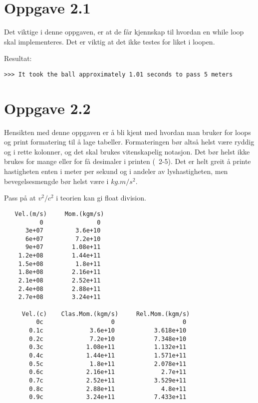 \documentclass[10pt,a4paper]{article}
\begin{document}
\section*{Oppgave 2.1}
Det viktige i denne oppgaven, er at de får kjennskap til hvordan en while loop skal implementeres. Det er viktig at det ikke testes for liket i loopen. 

Resultat:
\begin{verbatim}
>>> It took the ball approximately 1.01 seconds to pass 5 meters
\end{verbatim}

\section*{Oppgave 2.2}
Hensikten med denne oppgaven er å bli kjent med hvordan man bruker for loops og print formatering til å lage tabeller. Formateringen bør altså helst være ryddig og i rette kolonner, og det skal brukes vitenskapelig notasjon. Det bør helst ikke brukes for mange eller for få desimaler i printen (~2-5). Det er helt greit å printe hastigheten enten i meter per sekund og i andeler av lyshastigheten, men bevegelsesmengde bør helst være i $\si{kg.m/s^2}$.

Pass på at $v^2/c^2$ i teorien kan gi float division.





\newpage
\begin{verbatim}
   Vel.(m/s)     Mom.(kgm/s)
          0               0
      3e+07         3.6e+10
      6e+07         7.2e+10
      9e+07        1.08e+11
    1.2e+08        1.44e+11
    1.5e+08         1.8e+11
    1.8e+08        2.16e+11
    2.1e+08        2.52e+11
    2.4e+08        2.88e+11
    2.7e+08        3.24e+11

     Vel.(c)    Clas.Mom.(kgm/s)     Rel.Mom.(kgm/s)
         0c                   0                   0
       0.1c             3.6e+10           3.618e+10
       0.2c             7.2e+10           7.348e+10
       0.3c            1.08e+11           1.132e+11
       0.4c            1.44e+11           1.571e+11
       0.5c             1.8e+11           2.078e+11
       0.6c            2.16e+11             2.7e+11
       0.7c            2.52e+11           3.529e+11
       0.8c            2.88e+11             4.8e+11
       0.9c            3.24e+11           7.433e+11
\end{verbatim}
\end{document}
